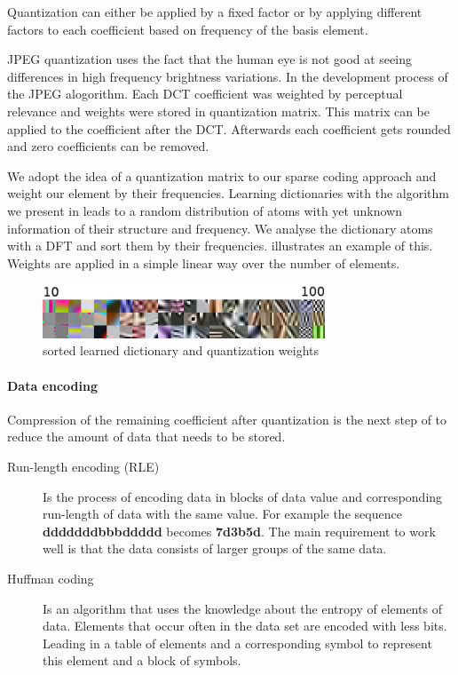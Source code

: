 Quantization can either be applied by a fixed factor or by applying different 
factors to each coefficient based on frequency of the basis element.

JPEG quantization uses the fact that the human eye is not good at seeing
differences in high frequency brightness variations. In the development
process of the JPEG alogorithm. Each DCT coefficient was weighted by perceptual
relevance and weights were stored in quantization matrix. 
This matrix can be applied to the coefficient after the DCT. 
Afterwards each coefficient gets rounded and zero coefficients can be removed.

We adopt the idea of a quantization matrix to our sparse coding approach and
weight our element by their frequencies. Learning dictionaries with the
algorithm we present in  leads to a random distribution of
atoms with yet unknown information of their structure and frequency. We analyse
the dictionary atoms with a DFT and sort them by their frequencies.
 illustrates an example of this. Weights are applied
in a simple linear way over the number of elements.

\begin{figure}[h]
\centering
\includegraphics[width = 0.75\textwidth]{images/sorted.png}
\caption{sorted learned dictionary and quantization weights}
\label{fig:sorted}
\end{figure}

\paragraph{Data encoding}
Compression of the remaining coefficient after quantization is the next step
of to reduce the amount of data that needs to be stored.

\begin{description}
 \item[Run-length encoding (RLE)] Is the process of encoding data in blocks of
data value and corresponding run-length of data with the same value. 
For example the sequence {\bf dddddddbbbddddd} becomes {\bf7d3b5d}.
The main requirement to work well is that the data consists of larger groups of
the same
data.
  \item[Huffman coding] Is an algorithm that uses the knowledge about the
entropy of elements of data. Elements that occur often in the data set are
encoded with less bits. Leading in a table of elements and a corresponding
symbol to represent this element and a block of symbols.
\end{description}

